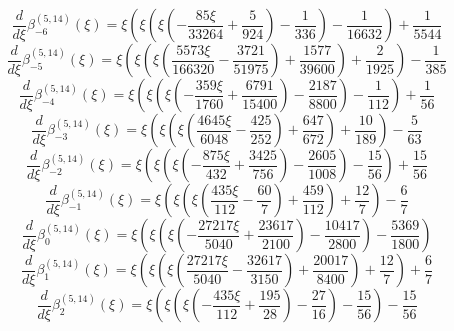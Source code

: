\begin{equation}
\frac{d}{d\xi}\beta_{-6}^{(5,14)} (\xi) =
 \xi \left(\xi \left(\xi \left(- \frac{85 \xi}{33264}
 + \frac{5}{924}\right) - \frac{1}{336}\right) - \frac{1}{16632}\right) + \frac{1}{5544}
\end{equation}
\begin{equation}
\frac{d}{d\xi}\beta_{-5}^{(5,14)} (\xi) =
 \xi \left(\xi \left(\xi \left(\frac{5573 \xi}{166320}
 - \frac{3721}{51975}\right) + \frac{1577}{39600}\right) + \frac{2}{1925}\right) - \frac{1}{385}
\end{equation}
\begin{equation}
\frac{d}{d\xi}\beta_{-4}^{(5,14)} (\xi) =
 \xi \left(\xi \left(\xi \left(- \frac{359 \xi}{1760}
 + \frac{6791}{15400}\right) - \frac{2187}{8800}\right) - \frac{1}{112}\right) + \frac{1}{56}
\end{equation}
\begin{equation}
\frac{d}{d\xi}\beta_{-3}^{(5,14)} (\xi) =
 \xi \left(\xi \left(\xi \left(\frac{4645 \xi}{6048}
 - \frac{425}{252}\right) + \frac{647}{672}\right) + \frac{10}{189}\right) - \frac{5}{63}
\end{equation}
\begin{equation}
\frac{d}{d\xi}\beta_{-2}^{(5,14)} (\xi) =
 \xi \left(\xi \left(\xi \left(- \frac{875 \xi}{432}
 + \frac{3425}{756}\right) - \frac{2605}{1008}\right) - \frac{15}{56}\right) + \frac{15}{56}
\end{equation}
\begin{equation}
\frac{d}{d\xi}\beta_{-1}^{(5,14)} (\xi) =
 \xi \left(\xi \left(\xi \left(\frac{435 \xi}{112}
 - \frac{60}{7}\right) + \frac{459}{112}\right) + \frac{12}{7}\right) - \frac{6}{7}
\end{equation}
\begin{equation}
\frac{d}{d\xi}\beta_{0}^{(5,14)} (\xi) =
 \xi \left(\xi \left(\xi \left(- \frac{27217 \xi}{5040}
 + \frac{23617}{2100}\right) - \frac{10417}{2800}\right) - \frac{5369}{1800}\right)
\end{equation}
\begin{equation}
\frac{d}{d\xi}\beta_{1}^{(5,14)} (\xi) =
 \xi \left(\xi \left(\xi \left(\frac{27217 \xi}{5040}
 - \frac{32617}{3150}\right) + \frac{20017}{8400}\right) + \frac{12}{7}\right) + \frac{6}{7}
\end{equation}
\begin{equation}
\frac{d}{d\xi}\beta_{2}^{(5,14)} (\xi) =
 \xi \left(\xi \left(\xi \left(- \frac{435 \xi}{112}
 + \frac{195}{28}\right) - \frac{27}{16}\right) - \frac{15}{56}\right) - \frac{15}{56}
\end{equation}
